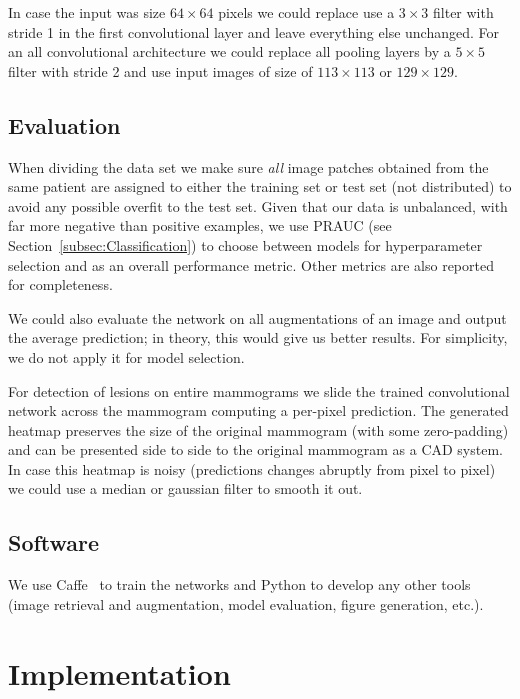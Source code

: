 	In case the input was size $64 \times 64$ pixels we could replace use a $3 \times 3$ filter with stride 1 in the first convolutional layer and leave everything else unchanged. For an all convolutional architecture we could replace all pooling layers by a $5 \times 5$ filter  with stride 2 and use input images of size of $113 \times 113$ or $129 \times 129$.

	\subsection{Evaluation}
	When dividing the data set we make sure \textit{all} image patches obtained from the same patient are assigned to either the training set or test set (not distributed) to avoid any possible overfit to the test set. Given that our data is unbalanced, with far more negative than positive examples, we use PRAUC (see Section~\ref{subsec:Classification}) to choose between models for hyperparameter selection and as an overall performance metric. Other metrics are also reported for completeness. 

	We could also evaluate the network on all augmentations of an image and output the average prediction; in theory, this would give us better results. For simplicity, we do not apply it for model selection.

	For detection of lesions on entire mammograms we slide the trained convolutional network across the mammogram computing a per-pixel prediction. The generated heatmap preserves the size of the original mammogram (with some zero-padding) and can be presented side to side to the original mammogram as a CAD system. In case this heatmap is noisy (predictions changes abruptly from pixel to pixel) we could use a median or gaussian filter to smooth it out.%

	\subsection{Software}
	We use Caffe~\cite{Jia2014} to train the networks and Python to develop any other tools (image retrieval and augmentation, model evaluation, figure generation, etc.).


\section{Implementation}



